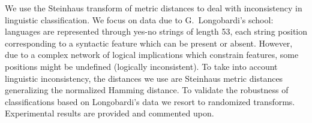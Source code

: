 
We use the Steinhaus transform of metric distances to deal with inconsistency in linguistic classification.  We focus on data due to G.\ Longobardi's school: languages are represented through yes-no strings of length 53, each string position corresponding to a syntactic feature which can be present or absent. However, due to a complex network of logical implications which constrain features, some positions might be undefined (logically inconsistent). To take into account linguistic inconsistency, the distances we use are Steinhaus metric distances generalizing the normalized Hamming distance. To validate the robustness of classifications based on Longobardi's data we resort to randomized transforms. Experimental results are provided and commented upon.

